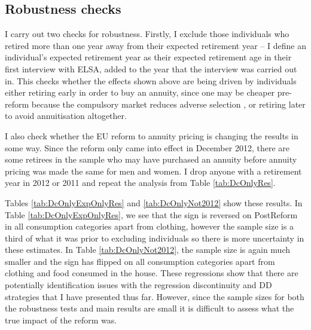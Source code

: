 \documentclass[12pt]{article}
\begin{document}
\begin{landscape}
    \linespread{1}
    
\end{landscape}
\begin{landscape}
    \linespread{1}
    
\end{landscape}

\begin{landscape}
    \linespread{1}
    
\end{landscape}

\subsection{Robustness checks}

I carry out two checks for robustness. Firstly, I exclude those individuals who
retired more than one year away from their expected retirement year -- I define
an individual's expected retirement year as their expected retirement age in
their first interview with ELSA, added to the year that the interview was
carried out in. This checks whether the effects shown above are being driven by
individuals either retiring early in order to buy an annuity, since one may be
cheaper pre-reform because the compulsory market reduces adverse selection
\cite{finkelstein_porteba_2002}, or retiring later to avoid annuitisation
altogether.

I also check whether the EU reform to annuity pricing is changing the results in
some way. Since the reform only came into effect in December 2012, there are some
retirees in the sample who may have purchased an annuity before
annuity pricing was made the same for men and women. I drop anyone with a
retirement year in 2012 or 2011 and repeat the analysis from Table
\ref{tab:DcOnlyRes}.

Tables \ref{tab:DcOnlyExpOnlyRes} and \ref{tab:DcOnlyNot2012} show these
results. In Table \ref{tab:DcOnlyExpOnlyRes}, we see that the sign is reversed on
PostReform in all consumption categories apart from clothing, however the sample
size is a third of what it was prior to excluding individuals so there is more
uncertainty in these estimates. In Table \ref{tab:DcOnlyNot2012}, the sample
size is again much smaller and the sign has flipped on all consumption
categories apart from clothing and food consumed in the house. These regressions
show that there are potentially identification issues with the regression
discontinuity and DD strategies that I have presented thus far. However, since
the sample sizes for both the robustness tests and main results are small it is
difficult to assess what the true impact of the reform was.
\end{document}
